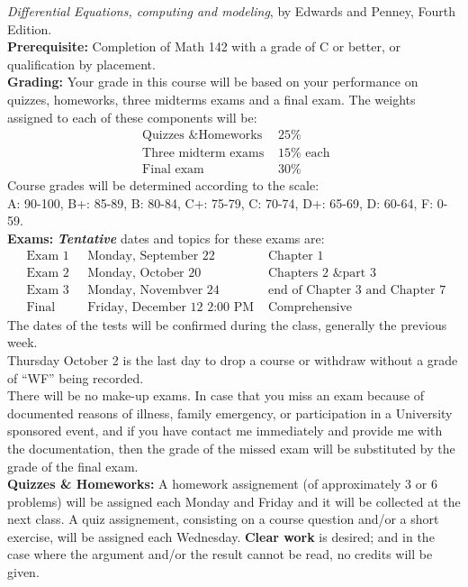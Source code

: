 \documentclass[11pt]{amsart}
\begin{document}
 {\em Differential Equations, computing and modeling}, by Edwards and Penney,
Fourth Edition.\\[0.3cm]
{\bf Prerequisite:} Completion of Math 142 with a grade of C or better, or qualification by placement.\\[0.3cm]
{\bf Grading:} Your grade in this course will be based on your performance on  quizzes, homeworks, three midterms 
exams and a final exam. The weights assigned to each of these components will be:
\[
\begin{array} {ll}
\mbox{ Quizzes \& Homeworks } & 25 \% \\
\mbox{ Three midterm exams } & 15 \% \mbox{ each} \\
\mbox{ Final exam } & 30 \%
\end{array}
\]
Course grades will be determined according to the scale:\\
A: 90-100, B+: 85-89, B: 80-84, C+: 75-79, C: 70-74, D+: 65-69, D: 60-64, F: 0-59.\\[0.3cm]
{\bf Exams:} {\em \bf Tentative} dates and topics for these exams are:
\[
\begin{array}{lll}
\mbox{ Exam 1 } & \mbox{ Monday, September 22} & \mbox{ Chapter } 1 \\
\mbox{ Exam 2 } & \mbox{ Monday, October 20} & \mbox{ Chapters 2 \& part 3}\\
\mbox{ Exam 3 } & \mbox{ Monday, Novembver 24} & \mbox{ end of Chapter 3 and Chapter } 7\\
\mbox{ Final} & \mbox{ Friday, December 12 2:00 PM}  & \mbox{ Comprehensive}
\end{array}
\]
The dates of the tests will be confirmed during the class, generally the previous week.\\
Thursday October 2 is the last day to drop a course or withdraw without a grade of ``WF'' being recorded.\\
There will be no make-up exams. In case that you miss an exam because of  documented reasons of illness, family
emergency, or participation in a University sponsored event, and if you have contact me immediately and provide me 
with the documentation, then the grade of the missed exam will be substituted by the grade of the final 
exam.\\[0.3cm]
{\bf Quizzes \& Homeworks:} A homework assignement (of approximately 3 or 6
problems) will be assigned each Monday and Friday and it will be collected at the next class. A quiz assignement, consisting on a course question and/or a short exercise, will be assigned each Wednesday. \textbf{Clear work} is desired; and in the case where the argument and/or the result cannot be read, no credits will be given.\\
\end{document}
